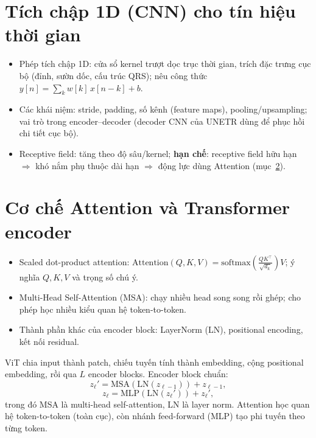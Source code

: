 \documentclass[../DoAn.tex]{subfiles}
\begin{document}
\section{Tích chập 1D (CNN) cho tín hiệu thời gian}
\begin{itemize}
  \item Phép tích chập 1D: cửa sổ kernel trượt dọc trục thời gian, trích đặc trưng cục bộ (đỉnh, sườn dốc, cấu trúc QRS); nêu công thức $y[n]=\sum_k w[k]\,x[n-k]+b$.
  \item Các khái niệm: stride, padding, số kênh (feature maps), pooling/upsampling; vai trò trong encoder--decoder (decoder CNN của UNETR dùng để phục hồi chi tiết cục bộ).
  \item Receptive field: tăng theo độ sâu/kernel; \textbf{hạn chế}: receptive field hữu hạn $\Rightarrow$ khó nắm phụ thuộc dài hạn $\Rightarrow$ động lực dùng Attention (mục~\ref{sec:attention}).
\end{itemize}

\section{Cơ chế Attention và Transformer encoder}
\label{sec:attention}

\begin{itemize}
  \item Scaled dot-product attention: $\mathrm{Attention}(Q,K,V)=\mathrm{softmax}\!\left(\frac{QK^\top}{\sqrt{d_k}}\right)V$; ý nghĩa $Q,K,V$ và trọng số chú ý.
  \item Multi-Head Self-Attention (MSA): chạy nhiều head song song rồi ghép; cho phép học nhiều kiểu quan hệ token-to-token.
  \item Thành phần khác của encoder block: LayerNorm (LN), positional encoding, kết nối residual.
\end{itemize}

ViT chia input thành patch, chiếu tuyến tính thành embedding, cộng positional embedding, rồi qua $L$ encoder blocks.
Encoder block chuẩn:
\begin{equation}
  z_\ell' = \mathrm{MSA}(\mathrm{LN}(z_{\ell-1})) + z_{\ell-1},
\end{equation}
\begin{equation}
  z_\ell = \mathrm{MLP}(\mathrm{LN}(z_\ell')) + z_\ell',
\end{equation}
trong đó MSA là multi-head self-attention, LN là layer norm. Attention học quan hệ token-to-token (toàn cục),
còn nhánh feed-forward (MLP) tạo phi tuyến theo từng token.
\end{document}
